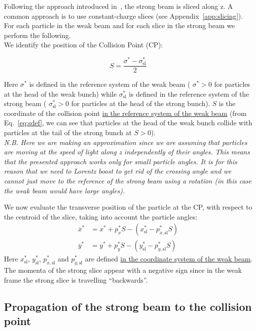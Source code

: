 Following the approach introduced in~\cite{hirata}, the strong beam is sliced along z. A common approach is to use constant-charge slices (see Appendix~\ref{app:slicing}). For each particle in the weak beam and for each slice in the strong beam we perform the following.
~\\

We identify the position of the Collision Point (CP):

\begin{equation}
S = \frac{\sigma^*-\sigma^*_\textrm{sl}}{2}
\label{eq:sdef}
\end{equation}

Here $\sigma^*$ is defined in the reference system of the weak beam ( $\sigma^*>0$ for particles at the head of the weak bunch) while $\sigma^*_\textrm{sl}$ is defined in the reference system of the strong beam ( $\sigma^*_\textrm{sl}>0$ for particles at the head of the strong bunch). $S$ is the coordinate of the collision point \underline{in the reference system of the weak beam} (from Eq.~\ref{eq:sdef}, we can see that particles at the head of the weak bunch collide with particles at the tail of the strong bunch at $S>0$). 
~\\

\textit{N.B. Here we are making an approximation since we are assuming that particles are moving at the speed of light along z independently of their angles. This means that the presented approach works only for small particle angles. It is for this reason that we need to Lorentz boost to get rid of the crossing angle and we cannot just move to the reference of the strong beam using a rotation (in this case the weak beam would have large angles).}

We now evaluate the transverse position of the particle at the CP, with respect to the centroid of the slice, taking into account the particle angles:
\begin{align}
\overline{x}^* &= x^* + p^*_x S - (x^*_\textrm{sl} - p^*_{x, \textrm{sl}} S)\\
\overline{y}^* &= y^* + p^*_y S - (y^*_\textrm{sl} - p^*_{y, \textrm{sl}} S)
\end{align}
Here $x^*_\textrm{sl}$, $y^*_\textrm{sl}$, $p^*_{x, \textrm{sl}}$ and $p^*_{y, \textrm{sl}}$  are defined \underline{in the coordinate system of the weak beam}. The momenta of the strong slice appear with a negative sign since in the weak frame the strong slice is travelling ``backwards''.

\subsection{Propagation of the strong beam to the collision point}

